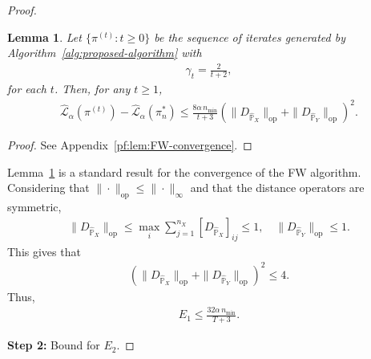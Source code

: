 \documentclass{article}
\theoremstyle{plain}
\newtheorem{lemma}[theorem]{Lemma}
\theoremstyle{definition}
\theoremstyle{remark}
\begin{document}
\begin{proof}
	\begin{lemma}		
		\label{lem:FW-convergence}		
		Let $\{\pi^{(t)}: t \geq 0\}$ be the sequence of iterates generated by Algorithm~\ref{alg:proposed-algorithm} with		
		\begin{align*}			
			\gamma_t = \frac{2}{t+2} ,			
		\end{align*}		
		for each $t$. Then, for any $t \geq 1$,		
		\begin{align*}			
			\hat{\mathcal{L}}_{\alpha}(\pi^{(t)}) - \hat{\mathcal{L}}_{\alpha}(\pi_n^*) \leq \frac{8\alpha\,n_{\min}}{t+3} \left(\|D_{\hat{\mathbb{P}}_X}\|_{\mathrm{op}} + \|D_{\hat{\mathbb{P}}_Y}\|_{\mathrm{op}}\right)^2 .			
		\end{align*}		
	\end{lemma}
	\begin{proof}
		See Appendix~\ref{pf:lem:FW-convergence}.
	\end{proof}
	
	Lemma~\ref{lem:FW-convergence} is a standard result for the convergence of the FW algorithm. Considering that $\|\cdot\|_{\mathrm{op}} \leq \|\cdot\|_{\infty}$ and that the distance operators are symmetric,
	\begin{align*}
		\|D_{\hat{\mathbb{P}}_X}\|_{\mathrm{op}} \leq \max_{i} \sum_{j=1}^{n_X} [D_{\hat{\mathbb{P}}_X}]_{ij} \leq 1 , \quad \|D_{\hat{\mathbb{P}}_Y}\|_{\mathrm{op}} \leq 1 .
	\end{align*}
	This gives that
	\begin{align*}
		\left(\|D_{\hat{\mathbb{P}}_X}\|_{\mathrm{op}} + \|D_{\hat{\mathbb{P}}_Y}\|_{\mathrm{op}}\right)^2 \leq 4 .
	\end{align*}
	Thus,
	\begin{align}
		\label{eq:optimization-error}
		E_1 \leq \frac{32\alpha \, n_{\min}}{T+3} .
	\end{align}
	
	{\large{\textbf{Step 2:} Bound for $E_2$.}}
	

\end{proof}
\end{document}
